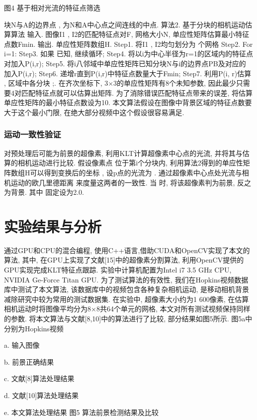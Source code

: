 图4  基于相对光流的特征点筛选

块N与A的边界点 ,  为N和A中心点之间连线的中点.
算法2. 基于分块的相机运动估算算法
输入. 图像I1 , I2的匹配特征点对F, 网格大小N, 单应性矩阵估算最小特征点数Fmin.
输出. 单应性矩阵数组H.
Step1. 将I1 , I2均匀划分为 个网格
Step2. For i=1: {
Step3. 如果 已知, 继续循环;
Step4. 将以i为中心半径为r=1的区域内的特征点对加入P(i,r);
Step5. 将i八邻域中单应性矩阵已知分块N与i的边界点PB及对应的 加入P(i,r);
Step6. 递增r直到P(i,r)中特征点数量大于Fmin;
Step7. 利用P(i, r)估算 , 区域中各分块 ;}.
在齐次坐标下, 3×3的单应性矩阵有8个未知参数, 因此最少只需要4对匹配特征点就可以估算出矩阵. 为了消除错误匹配特征点带来的误差, 将估算单应性矩阵的最小特征点数设为10. 本文算法假设在图像中背景区域的特征点数要大于这个最小门限, 在绝大部分视频中这个假设很容易满足.


\subsubsection{运动一致性验证}
\label{ch5:sec:sub:sub:motionC}

 对预处理后可能为前景的超像素, 利用KLT计算超像素中心点的光流, 并将其与估算的相机运动进行比较. 假设像素点 位于第i个分块内, 利用算法2得到的单应性矩阵数组H可以得到变换后的坐标 , 设p点的光流为 . 通过超像素中心点处光流与相机运动的欧几里德距离  来度量这两者的一致性. 当 时, 将该超像素判为前景, 反之为背景. 其中 固定设为2.0.
\section{实验结果与分析}
\label{ch5:sec:results}
 通过GPU和CPU的混合编程, 使用C++语言,借助CUDA和OpenCV实现了本文的算法, 其中, 在GPU上实现了文献[15]中的超像素分割算法, 利用OpenCV提供的GPU实现完成KLT特征点跟踪. 实验中计算机配置为Intel i7 3.5 GHz CPU, NVIDIA Ge-Force Titan GPU. 为了测试算法的有效性, 我们在Hopkins视频数据库中测试了本文算法, 该数据库中的视频包含各种复杂相机运动, 是移动相机背景减除研究中较为常用的测试数据集. 在实验中, 超像素大小约为1 600像素, 在估算相机运动时将图像平均分为8×8共64个单元的网格, 本文对所有测试视频保持同样的参数.
将本文算法与文献[8,10]中的算法进行了比较, 部分结果如图5所示. 图5a中分别为Hopkins视频



a. 输入图像

b. 前景正确结果

c. 文献[8]算法处理结果

d. 文献[10]算法处理结果

e. 本文算法处理结果
图5  算法前景检测结果及比较

